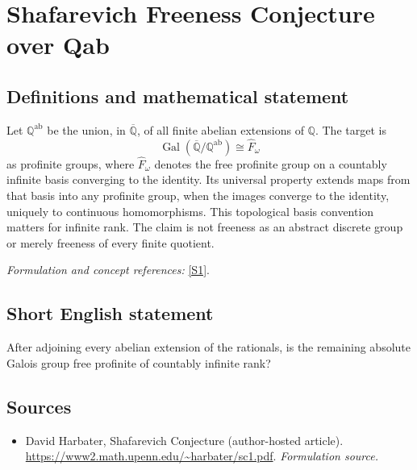 \documentclass[11pt]{article}
\begin{document}
\section*{\texorpdfstring{Shafarevich Freeness Conjecture over Qab}{Shafarevich Freeness Conjecture over Qab}}\label{statement}
\subsection{Definitions and mathematical statement}
Let ${\mathbb{Q}}^{\mathrm{ab}}$ be the union, in $\overline{{\mathbb{Q}}}$, of all finite abelian extensions of ${\mathbb{Q}}$. The target is
\[
 \operatorname{Gal}(\overline{{\mathbb{Q}}}/{\mathbb{Q}}^{\mathrm{ab}})\cong\widehat F_\omega
\]
as profinite groups, where $\widehat F_\omega$ denotes the free profinite group on a countably infinite basis converging to the identity. Its universal property extends maps from that basis into any profinite group, when the images converge to the identity, uniquely to continuous homomorphisms. This topological basis convention matters for infinite rank. The claim is not freeness as an abstract discrete group or merely freeness of every finite quotient.
\par\smallskip\textit{Formulation and concept references:} \href{https://www2.math.upenn.edu/~harbater/sc1.pdf}{[S1]}.

\subsection{Short English statement}
After adjoining every abelian extension of the rationals, is the remaining absolute Galois group free profinite of countably infinite rank?
\subsection{Sources}
\begin{itemize}
\item[S1]David Harbater, Shafarevich Conjecture (author-hosted article).
\url{https://www2.math.upenn.edu/~harbater/sc1.pdf}.
\textit{Formulation source.}
\end{itemize}
\end{document}

